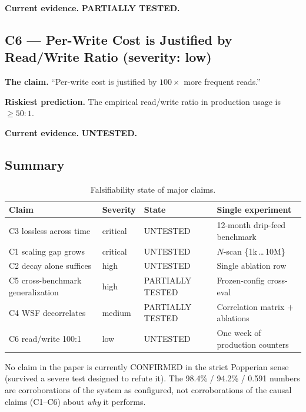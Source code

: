\documentclass[11pt]{article}
\begin{document}
\textbf{Current evidence.} \textbf{PARTIALLY TESTED.}

\subsection{C6 --- Per-Write Cost is Justified by Read/Write Ratio (severity: low)}
\label{app:popper-c6}

\textbf{The claim.} ``Per-write cost is justified by $100\times$
more frequent reads.''

\textbf{Riskiest prediction.}  The empirical read/write ratio in
production usage is $\ge 50:1$.

\textbf{Current evidence.} \textbf{UNTESTED.}

\subsection{Summary}
\label{app:popper-summary}

\begin{table}[h]
\centering
\caption{Falsifiability state of major claims.}
\label{tab:popper-summary}
\small
\begin{tabular}{llll}
\toprule
Claim & Severity & State & Single experiment \\
\midrule
C3 lossless across time         & critical & UNTESTED         & 12-month drip-feed benchmark \\
C1 scaling gap grows            & critical & UNTESTED         & $N$-scan \{1k\,\dots\,10M\} \\
C2 decay alone suffices         & high     & UNTESTED         & Single ablation row \\
C5 cross-benchmark generalization & high   & PARTIALLY TESTED & Frozen-config cross-eval \\
C4 WSF decorrelates            & medium   & PARTIALLY TESTED & Correlation matrix $+$ ablations \\
C6 read/write 100:1             & low      & UNTESTED         & One week of production counters \\
\bottomrule
\end{tabular}
\end{table}

No claim in the paper is currently CONFIRMED in the strict
Popperian sense (survived a severe test designed to refute it).
The 98.4\% / 94.2\% / 0.591 numbers are corroborations of the
system as configured, not corroborations of the causal claims
(C1--C6) about \emph{why} it performs.
\end{document}
